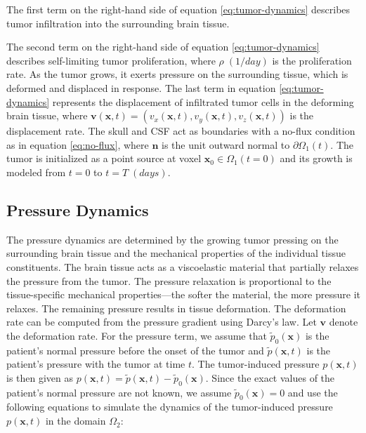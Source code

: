 \documentclass[12pt]{article}
\newcommand{\bn}{\mathbf{n}}
\newcommand{\bv}{\mathbf{v}}
\newcommand{\bx}{\mathbf{x}}
\newcommand{\bI}{\mathbf{I}}
\newcommand{\wt}{\widetilde}
\begin{document}
The first term on the right-hand side of equation \eqref{eq:tumor-dynamics} describes tumor infiltration into the surrounding brain tissue.

The second term on the right-hand side of equation \eqref{eq:tumor-dynamics} describes self-limiting tumor proliferation, where \( \rho \; (\si{1/day}) \) is the proliferation rate. As the tumor grows, it exerts pressure on the surrounding tissue, which is deformed and displaced in response. The last term in equation \eqref{eq:tumor-dynamics} represents the displacement of infiltrated tumor cells in the deforming brain tissue, where \( \bv(\bx, t) = (v_x(\bx, t), v_y(\bx, t), v_z(\bx, t)) \) is the displacement rate. The skull and CSF act as boundaries with a no-flux condition as in equation \eqref{eq:no-flux}, where \( \bn \) is the unit outward normal to \( \partial \Omega_1(t) \). The tumor is initialized as a point source at voxel \( \bx_0 \in \Omega_1(t = 0) \) and its growth is modeled from \( t = 0 \) to \( t = T \; (\si{days}) \).

\subsection{Pressure Dynamics}

The pressure dynamics are determined by the growing tumor pressing on the surrounding brain tissue and the mechanical properties of the individual tissue constituents. The brain tissue acts as a viscoelastic material that partially relaxes the pressure from the tumor. The pressure relaxation is proportional to the tissue-specific mechanical properties—the softer the material, the more pressure it relaxes. The remaining pressure results in tissue deformation. The deformation rate can be computed from the pressure gradient using Darcy's law. Let \(\bv\) denote the deformation rate. For the pressure term, we assume that \( \wt p_0(\bx) \) is the patient's normal pressure before the onset of the tumor and \( \wt p(\bx, t) \) is the patient's pressure with the tumor at time \( t \). The tumor-induced pressure \( p(\bx, t) \) is then given as \( p(\bx, t) = \wt p(\bx, t) - \wt p_0(\bx) \). Since the exact values of the patient's normal pressure are not known, we assume \( \wt p_0(\bx) = 0 \) and use the following equations to simulate the dynamics of the tumor-induced pressure \( p(\bx, t) \) in the domain \( \Omega_2 \):
\end{document}
